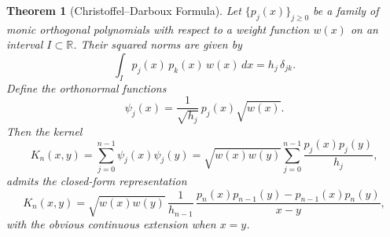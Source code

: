 \documentclass[letterpaper,11pt,oneside,reqno]{book}
\numberwithin{equation}{chapter}  %
\newtheorem{theorem}[proposition]{Theorem}
\theoremstyle{definition}
\begin{document}
\begin{theorem}[Christoffel--Darboux Formula]
Let \(\{p_j(x)\}_{j\ge0}\) be a family of \emph{monic} orthogonal polynomials with respect to a weight function \(w(x)\) on an interval \(I\subset\mathbb{R}\). Their squared norms are given by
\[
\int_I p_j(x)\,p_k(x)\,w(x)\,dx = h_j\,\delta_{jk}.
\]
Define the orthonormal functions
\[
\psi_j(x)=\frac{1}{\sqrt{h_j}}\,p_j(x)\sqrt{w(x)}.
\]
Then the kernel
\[
K_n(x,y)=\sum_{j=0}^{n-1}\psi_j(x)\psi_j(y)
=\sqrt{w(x)w(y)}\sum_{j=0}^{n-1}\frac{p_j(x)p_j(y)}{h_j},
\]
admits the closed-form representation
\begin{equation}
\label{lecture5:eq:CD}
K_n(x,y)=\sqrt{w(x)w(y)}\,\frac{1}{h_{n-1}}\,\frac{p_n(x)p_{n-1}(y)-p_{n-1}(x)p_n(y)}{x-y},
\end{equation}
with the obvious continuous extension when \(x=y\).
\end{theorem}
\end{document}
